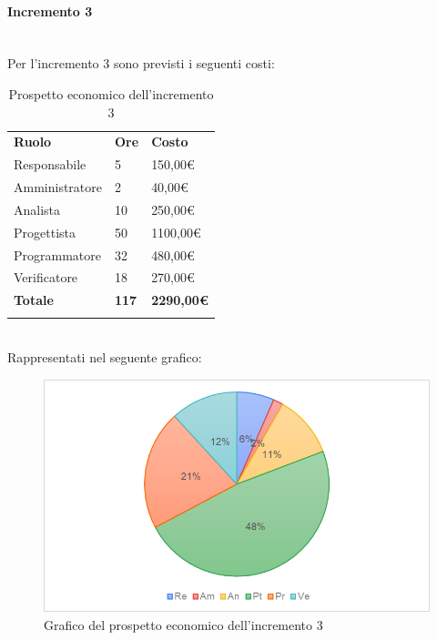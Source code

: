 \paragraph{Incremento 3} \mbox{} \\
Per l'incremento 3 sono previsti i seguenti costi:
\begin{longtable} {
		>{}p{32mm}
		>{}p{20mm}
		>{}p{20mm}
	}
	\rowcolor{gray!50}
	
	\textbf{Ruolo} & \textbf{Ore} & \textbf{Costo} \TBstrut \\
	Responsabile & 5 & 150,00\euro{} \TBstrut \\
	Amministratore & 2 & 40,00\euro{} \TBstrut \\
	Analista & 10 & 250,00\euro{} \TBstrut \\
	Progettista & 50 & 1100,00\euro{}\TBstrut \\
	Programmatore & 32 & 480,00\euro{} \TBstrut \\
	Verificatore & 18 & 270,00\euro{} \TBstrut \\
	\textbf{Totale} & \textbf{117}& \textbf{2290,00\euro{}} \TBstrut \\	
	\rowcolor{white}
	\caption{Prospetto economico dell'incremento 3}
\end{longtable} \mbox{} \\
Rappresentati nel seguente grafico: \mbox{}
\begin{figure} [H]
	\includegraphics[width=\linewidth]{./img/Grafici/23.png}
	\caption{Grafico del prospetto economico dell'incremento 3}
\end{figure}

